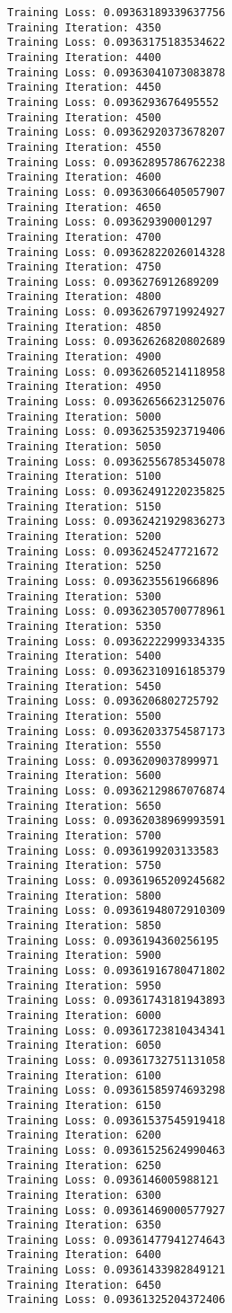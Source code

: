 \documentclass[11pt]{article}
\begin{document}
\begin{Verbatim}[commandchars=\\\{\}]
Training Loss: 0.09363189339637756
Training Iteration: 4350
Training Loss: 0.09363175183534622
Training Iteration: 4400
Training Loss: 0.09363041073083878
Training Iteration: 4450
Training Loss: 0.0936293676495552
Training Iteration: 4500
Training Loss: 0.09362920373678207
Training Iteration: 4550
Training Loss: 0.09362895786762238
Training Iteration: 4600
Training Loss: 0.09363066405057907
Training Iteration: 4650
Training Loss: 0.093629390001297
Training Iteration: 4700
Training Loss: 0.09362822026014328
Training Iteration: 4750
Training Loss: 0.0936276912689209
Training Iteration: 4800
Training Loss: 0.09362679719924927
Training Iteration: 4850
Training Loss: 0.09362626820802689
Training Iteration: 4900
Training Loss: 0.09362605214118958
Training Iteration: 4950
Training Loss: 0.09362656623125076
Training Iteration: 5000
Training Loss: 0.09362535923719406
Training Iteration: 5050
Training Loss: 0.09362556785345078
Training Iteration: 5100
Training Loss: 0.09362491220235825
Training Iteration: 5150
Training Loss: 0.09362421929836273
Training Iteration: 5200
Training Loss: 0.0936245247721672
Training Iteration: 5250
Training Loss: 0.0936235561966896
Training Iteration: 5300
Training Loss: 0.09362305700778961
Training Iteration: 5350
Training Loss: 0.09362222999334335
Training Iteration: 5400
Training Loss: 0.09362310916185379
Training Iteration: 5450
Training Loss: 0.0936206802725792
Training Iteration: 5500
Training Loss: 0.09362033754587173
Training Iteration: 5550
Training Loss: 0.0936209037899971
Training Iteration: 5600
Training Loss: 0.09362129867076874
Training Iteration: 5650
Training Loss: 0.09362038969993591
Training Iteration: 5700
Training Loss: 0.0936199203133583
Training Iteration: 5750
Training Loss: 0.09361965209245682
Training Iteration: 5800
Training Loss: 0.09361948072910309
Training Iteration: 5850
Training Loss: 0.0936194360256195
Training Iteration: 5900
Training Loss: 0.09361916780471802
Training Iteration: 5950
Training Loss: 0.09361743181943893
Training Iteration: 6000
Training Loss: 0.09361723810434341
Training Iteration: 6050
Training Loss: 0.09361732751131058
Training Iteration: 6100
Training Loss: 0.09361585974693298
Training Iteration: 6150
Training Loss: 0.09361537545919418
Training Iteration: 6200
Training Loss: 0.09361525624990463
Training Iteration: 6250
Training Loss: 0.0936146005988121
Training Iteration: 6300
Training Loss: 0.09361469000577927
Training Iteration: 6350
Training Loss: 0.09361477941274643
Training Iteration: 6400
Training Loss: 0.09361433982849121
Training Iteration: 6450
Training Loss: 0.09361325204372406

\end{Verbatim}
\end{document}
